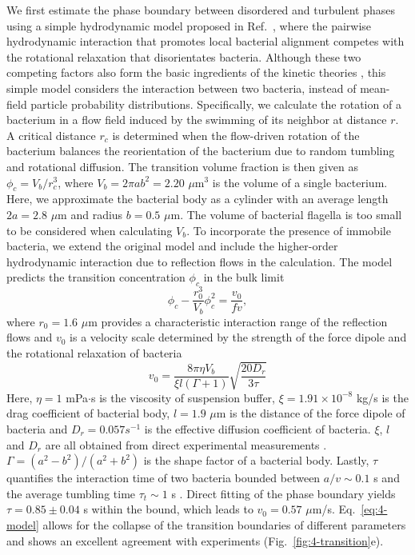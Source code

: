 We first estimate the phase boundary between disordered and turbulent phases using a simple hydrodynamic model proposed in Ref.~\cite{Drescher2011}, where the pairwise hydrodynamic interaction that promotes local bacterial alignment competes with the rotational relaxation that disorientates bacteria. Although these
two competing factors also form the basic ingredients of the kinetic theories \cite{Koch2011, Saintillan2015}, this simple model considers the interaction between two bacteria, instead of mean-field particle probability distributions. Specifically, we calculate the rotation of a bacterium in a flow field induced by the swimming of its neighbor at distance $r$. A critical distance $r_c$ is determined when the flow-driven rotation of the bacterium balances the reorientation of the bacterium due to random tumbling and rotational diffusion. The transition volume fraction is then given as $\phi_c=V_b/r_c^3$, where $V_b = 2\pi ab^2 = 2.20$ $\mu$m$^3$ is the volume of a single bacterium. Here, we approximate the bacterial body as a cylinder with an average length $2a = 2.8$ $\mu$m and
radius $b = 0.5$ $\mu$m. The volume of bacterial flagella is too small to be considered when calculating $V_b$. To incorporate the presence of immobile bacteria, we extend the original model and include the higher-order hydrodynamic interaction due to reflection flows in the calculation. The model predicts the transition concentration $\phi_c$ in the bulk limit
\begin{equation}
  \label{eq:4-model}
  \phi_c-\frac{r_0^3}{V_b}\phi_c^2 = \frac{v_0}{fv},
\end{equation}
where $r_0 = 1.6$ $\mu$m provides a characteristic interaction range of the reflection flows and $v_0$ is a velocity scale determined by the strength of the force dipole and the rotational relaxation of bacteria
$$
v_0 = \frac{8\pi\eta V_b}{\xi l (\Gamma+1)}\sqrt{\frac{20D_r}{3\tau}}
$$
Here, $\eta = 1$ mPa$\cdot$s is the viscosity of suspension buffer, $\xi = 1.91 \times 10^{-8}$ kg/s is the drag coefficient of bacterial body, $l = 1.9$ $\mu$m is the distance of the force dipole of bacteria and $D_r = 0.057 s^{-1}$ is the effective diffusion coefficient of bacteria. $\xi$, $l$ and $D_r$ are all obtained from direct experimental measurements \cite{Drescher2011}.
$\Gamma = (a^2-b^2)/(a^2+b^2)$ is the shape factor of a bacterial body.
Lastly, $\tau$ quantifies the interaction time of two bacteria bounded between $a/v \sim 0.1$ s and the average tumbling time $\tau_t \sim 1$ s \cite{Berg2004}. Direct fitting of the phase boundary yields $\tau = 0.85 \pm 0.04$ s within the bound, which leads to $v_0 = 0.57$ $\mu$m/s. Eq.~\ref{eq:4-model} allows for the collapse of the transition boundaries of different parameters and shows an excellent agreement with experiments (Fig.~\ref{fig:4-transition}e).
